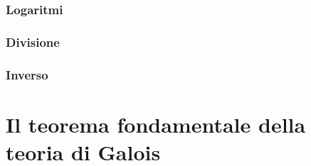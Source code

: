 
\subsubsection{Logaritmi}



\subsubsection{Divisione}

\textsf{\small }

\subsubsection{Inverso} %

\textsf{\small }


\section{Il teorema fondamentale della teoria di Galois} %
\textsf{\small } 

